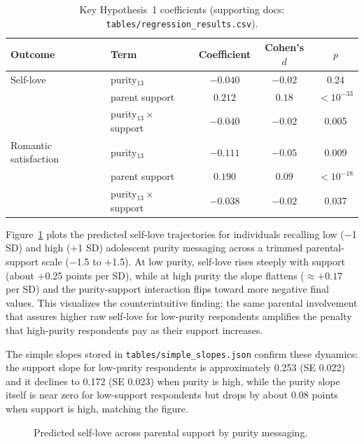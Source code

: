 \documentclass[12pt]{article}
\begin{document}
\begin{table}[t]
\centering
\caption{Key Hypothesis~1 coefficients (supporting docs: \texttt{tables/regression\_results.csv}).}
\label{tab:hyp1}
\begin{tabular}{@{}llccc@{}}
\toprule
Outcome & Term & Coefficient & Cohen's $d$ & $p$ \\
\midrule
Self-love & purity$_{13}$ & $-0.040$ & $-0.02$ & 0.24 \\
 & parent support & $0.212$ & $0.18$ & $<10^{-33}$ \\
 & purity$_{13} \times$ support & $-0.040$ & $-0.02$ & 0.005 \\
\midrule
Romantic satisfaction & purity$_{13}$ & $-0.111$ & $-0.05$ & 0.009 \\
 & parent support & $0.190$ & $0.09$ & $<10^{-18}$ \\
 & purity$_{13} \times$ support & $-0.038$ & $-0.02$ & 0.037 \\
\bottomrule
\end{tabular}
\end{table}

Figure~\ref{fig:marginal-self-love} plots the predicted self-love trajectories for individuals recalling low (−1 SD) and high (+1 SD) adolescent purity messaging across a trimmed parental-support scale (−1.5 to +1.5). At low purity, self-love rises steeply with support (about +0.25 points per SD), while at high purity the slope flattens ($\approx +0.17$ per SD) and the purity-support interaction flips toward more negative final values. This visualizes the counterintuitive finding: the same parental involvement that assures higher raw self-love for low-purity respondents amplifies the penalty that high-purity respondents pay as their support increases.

The simple slopes stored in \texttt{tables/simple\_slopes.json} confirm these dynamics: the support slope for low-purity respondents is approximately 0.253 (SE 0.022) and it declines to 0.172 (SE 0.023) when purity is high, while the purity slope itself is near zero for low-support respondents but drops by about 0.08 points when support is high, matching the figure.

\begin{figure}[t]
\centering
{}
\caption{Predicted self-love across parental support by purity messaging.}
\label{fig:marginal-self-love}
\end{figure}
\end{document}
